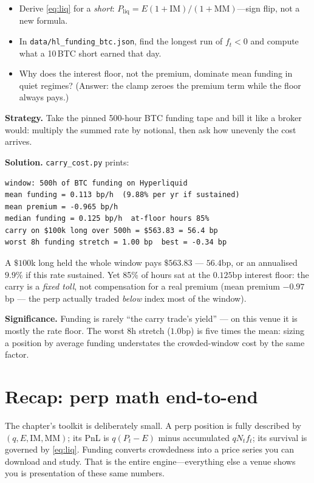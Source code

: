 \begin{checkpoint}
\begin{itemize}
\item Derive \eqref{eq:liq} for a \emph{short}: $P_{\mathrm{liq}} = E(1+\mathrm{IM})/(1+\mathrm{MM})$---sign flip, not a new formula.
\item In \texttt{data/hl\_funding\_btc.json}, find the longest run of $f_t<0$ and compute what a 10\,BTC short earned that day.
\item Why does the interest floor, not the premium, dominate mean funding in quiet regimes? (Answer: the clamp zeroes the premium term while the floor always pays.)
\end{itemize}
\end{checkpoint}

\begin{example}\label{ex:carrycost}
\textbf{Strategy.} Take the pinned 500-hour BTC funding tape and
bill it like a broker would: multiply the summed rate by notional,
then ask how unevenly the cost arrives.

\textbf{Solution.} \texttt{carry\_cost.py} prints:
\begin{verbatim}
window: 500h of BTC funding on Hyperliquid
mean funding = 0.113 bp/h  (9.88% per yr if sustained)
mean premium = -0.965 bp/h
median funding = 0.125 bp/h  at-floor hours 85%
carry on $100k long over 500h = $563.83 = 56.4 bp
worst 8h funding stretch = 1.00 bp  best = -0.34 bp
\end{verbatim}
A $\$100$k long held the whole window pays $\$563.83$ ---
$56.4$bp, or an annualised $9.9\%$ if this rate sustained. Yet
85\% of hours sat at the $0.125$bp interest floor: the carry is a
\emph{fixed toll}, not compensation for a real premium (mean
premium $-0.97$bp --- the perp actually traded \emph{below} index
most of the window).

\textbf{Significance.} Funding is rarely ``the carry trade's
yield'' --- on this venue it is mostly the rate floor. The worst
8h stretch ($1.0$bp) is five times the mean: sizing a position
by average funding understates the crowded-window cost by the
same factor.
\end{example}

\section{Recap: perp math end-to-end}\label{sec:perprecap}

The chapter's toolkit is deliberately small. A perp position is fully described by
$(q, E, \mathrm{IM}, \mathrm{MM})$; its PnL is $q(P_t-E)$ minus accumulated
$qN_t f_t$; its survival is governed by \eqref{eq:liq}. Funding converts crowdedness into a
price series you can download and study. That is the entire engine---everything else a venue
shows you is presentation of these same numbers.

